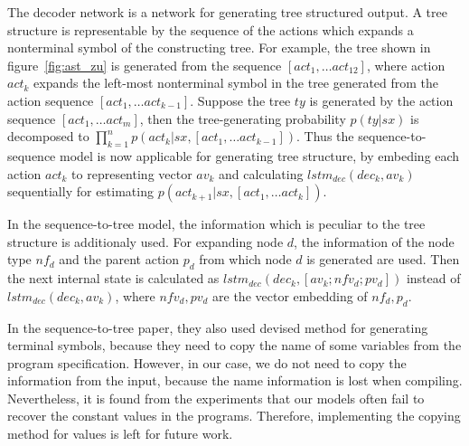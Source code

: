 \documentclass[senior,final,11pt]{iscs-thesis}
\begin{document}
The decoder network is a network for generating tree structured output. 
A tree structure is representable by the sequence of the actions which expands a nonterminal symbol of the constructing tree.
For example, the tree shown in figure~\ref{fig:ast_zu} is generated from the sequence $ [act_1, \dots act_{12}] $, 
where action $ act_k $ expands the left-most nonterminal symbol in the tree generated from the action sequence $ [act_1, \dots act_{k-1}] $. 
Suppose the tree $ty$ is generated by the action sequence $ [act_1, \dots act_m] $, 
then the tree-generating probability $ p(ty|sx) $ is decomposed to $ \prod_{k=1}^n p(act_k|sx,[act_1, \dots act_{k-1}]) $. 
Thus the sequence-to-sequence model is now applicable for generating tree structure, by embeding each action $act_k$ to representing vector $av_k$ and 
calculating $ lstm_{dec}(dec_{k},av_{k}) $ sequentially for estimating $p(act_{k+1}|sx,[act_1, \dots act_{k}]) $.  


In the sequence-to-tree model, the information which is peculiar to the tree structure is additionaly used.
For expanding node $d$, the information of the node type $ nf_{d} $ and the parent action $p_{d}$ from which node $d$ is generated are used.
Then the next internal state is calculated as $ lstm_{dec}(dec_{k},[av_{k}; nfv_{d}; pv_{d}]) $ instead of $ lstm_{dec}(dec_{k},av_{k}) $, 
where $nfv_{d},pv_{d}$ are the vector embedding of $nf_{d},p_{d}$.

In the sequence-to-tree paper, they also used devised method for generating terminal symbols, because they need to copy the name of some variables from the program specification.
However, in our case, we do not need to copy the information from the input, because the name information is lost when compiling.
Nevertheless, it is found from the experiments that our models often fail to recover the constant values in the programs.
Therefore, implementing the copying method for values is left for future work.

\end{document}
